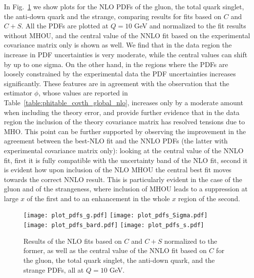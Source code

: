     In Fig.~\ref{fig:pdfs_plots_th_err} we show plots for the NLO PDFs of the gluon, the total quark singlet,
    the anti-down quark and the strange, comparing results for fits based on $C$ and $C+S$.
    All the PDFs are plotted at $Q=10$ GeV and normalized to the fit results without MHOU, 
    and the central value of the NNLO fit based on the experimental covariance matrix only is shown as well.
    We find that in the data region the increase in PDF uncertainties is very moderate, while the central values 
    can shift by up to one sigma. On the other hand, in the regions where the PDFs are loosely constrained by the experimental
    data the PDF uncertainties increases significantly.
    These features are in agreement with the observation that the estimator $\phi$, whose values are reported 
    in Table~\ref{table:phitable_covth_global_nlo}, increases only by a moderate amount when including the theory error,
    and provide further evidence that in the data region the inclusion of the theory covariance matrix has resolved tensions
    due to MHO.
    This point can be further supported by observing the improvement in the agreement between the best-NLO fit and the NNLO PDFs
    (the latter with experimental covariance matrix only): looking at the central value of the NNLO fit, 
    first it is fully compatible with the uncertainty band of the NLO fit, second it is evident how upon inclusion of 
    the NLO MHOU the central best fit moves towards the correct NNLO result.
    This is particularly evident in the case of the gluon and of the strangeness, where inclusion of MHOU leads to a
    suppression at large $x$ of the first and to an enhancement in the whole $x$ region of the second.  
    \begin{figure}[t!]
        \begin{center}
            \texttt{[image: plot\_pdfs\_g.pdf]}
            \texttt{[image: plot\_pdfs\_Sigma.pdf]}
            \texttt{[image: plot\_pdfs\_bard.pdf]}
            \texttt{[image: plot\_pdfs\_s.pdf]}
            \caption{Results of the NLO fits based on $C$ and $C + S$ normalized to the
            former, as well as the central value of the NNLO fit based on $C$ for the gluon, the total quark singlet, 
            the anti-down quark, and the strange PDFs, all at $Q = 10$ GeV.} 
            \label{fig:pdfs_plots_th_err} 
        \end{center}
    \end{figure}


